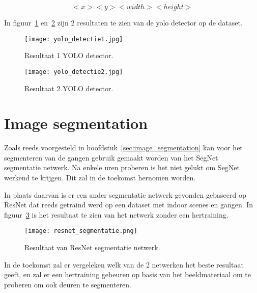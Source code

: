    \begin{equation} \label{eq:yolo}
      <x> <y> <width> <height> 
   \end{equation}

   In figuur~\ref{fig:yolo_1} en~\ref{fig:yolo_2} zijn 2 resultaten te zien van de \gls{yolo} detector op de dataset.

   \begin{figure}[H]
      \centering
      \texttt{[image: yolo\_detectie1.jpg]}
      \caption{Resultaat 1 YOLO detector.}
      \label{fig:yolo_1}
   \end{figure}

   \begin{figure}[!htb]
      \centering
      \texttt{[image: yolo\_detectie2.jpg]}
      \caption{Resultaat 2 YOLO detector.}
      \label{fig:yolo_2}
   \end{figure}

\newpage
\section{Image segmentation}

   Zoals reeds voorgesteld in hoofdstuk~\ref{sec:image_segmentation} kan voor het segmenteren van de gangen gebruik gemaakt worden van het SegNet~\cite{Badrinarayanan} segmentatie netwerk.
   Na enkele uren proberen is het niet gelukt om SegNet werkend te krijgen. Dit zal in de toekomst hernomen worden.

   In plaats daarvan is er een ander segmentatie netwerk gevonden gebaseerd op ResNet dat reeds getraind werd op een dataset met indoor scenes en gangen.
   In figuur~\ref{fig:resnet_seg} is het resultaat te zien van het netwerk zonder een hertraining.

   
   \begin{figure}[!htb]
      \centering
      \texttt{[image: resnet\_segmentatie.png]}
      \caption{Resultaat van ResNet segmentatie netwerk.}
      \label{fig:resnet_seg}
   \end{figure}

   In de toekomst zal er vergeleken welk van de 2 netwerken het beste resultaat geeft, en zal er een hertraining gebeuren op basis van het beeldmateriaal om te proberen om ook deuren te segmenteren.